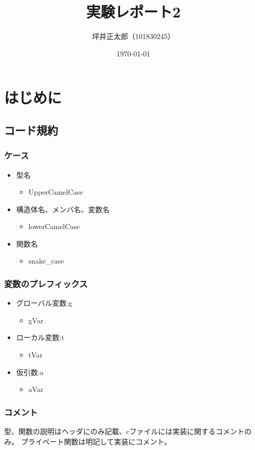 \documentclass[a4paper,10pt]{jsarticle}
\begin{document}
\title{実験レポート2}
\author{坪井正太郎（101830245）}
\date{\today}
\maketitle
\section{はじめに}
\subsection{コード規約}
\subsubsection*{ケース}
\begin{itemize}
  \item 型名
        \begin{itemize}
          \item UpperCamelCase
        \end{itemize}
  \item 構造体名、メンバ名、変数名
        \begin{itemize}
          \item lowerCamelCase
        \end{itemize}
  \item 関数名
        \begin{itemize}
          \item snake\_case
        \end{itemize}
\end{itemize}

\subsubsection*{変数のプレフィックス}
\begin{itemize}
  \item グローバル変数:g
        \begin{itemize}
          \item gVar
        \end{itemize}
  \item ローカル変数:t
        \begin{itemize}
          \item tVar
        \end{itemize}
  \item 仮引数:a
        \begin{itemize}
          \item aVar
        \end{itemize}
\end{itemize}

\subsubsection*{コメント}
型、関数の説明はヘッダにのみ記載、cファイルには実装に関するコメントのみ。
プライベート関数は明記して実装にコメント。




\end{document}
